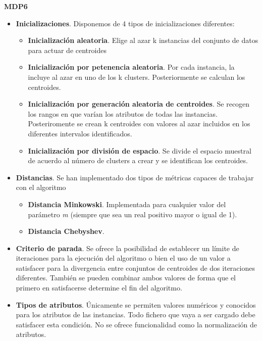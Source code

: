 \documentclass[a4paper]{report}
\begin{document}
	
	\begin{center}
		\textbf{MDP6}
	\end{center}
	
	\begin{itemize}
		\item	\textbf{Inicializaciones}. Disponemos de 4 tipos de inicializaciones diferentes:
			\begin{itemize}
			\item	\textbf{Inicialización aleatoria}. Elige al azar k instancias del conjunto de datos para actuar de centroides
			\item	\textbf{Inicialización por petenencia aleatoria}. Por cada instancia, la incluye al azar en uno de los k clusters. Posteriormente se calculan los centroides.
			\item	\textbf{Inicialización por generación aleatoria de centroides}. Se recogen los rangos en que varían los atributos de todas las instancias. Posteriromente se crean k centroides con valores al azar incluidos en los diferentes intervalos identificados.
			\item	\textbf{Inicialización por división de espacio}. Se divide el espacio muestral de acuerdo al número de clusters a crear y se identifican los centroides.
			\end{itemize}
			
		\item	\textbf{Distancias}. Se han implementado dos tipos de métricas capaces de trabajar con el algoritmo
			\begin{itemize}
			\item	\textbf{Distancia Minkowski}. Implementada para cualquier valor del parámetro \textit{m} (siempre que sea un real positivo mayor o igual de 1).
			\item	\textbf{Distancia Chebyshev}.
			\end{itemize}
			
		\item	\textbf{Criterio de parada}. Se ofrece la posibilidad de establecer un límite de iteraciones para la ejecución del algoritmo o bien el uso de un valor a satisfacer para la divergencia entre conjuntos de centroides de dos iteraciones diferentes. También se pueden combinar ambos valores de forma que el primero en satisfacerse determine el fin del algoritmo.
		
		\item	\textbf{Tipos de atributos}. Únicamente se permiten valores numéricos y conocidos para los atributos de las instancias. Todo fichero que vaya a ser cargado debe satisfacer esta condición. No se ofrece funcionalidad como la normalización de atributos.
		

\end{itemize}
\end{document}
